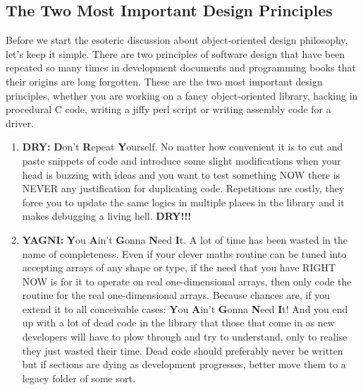\documentclass[a4paper,11pt]{article}
\begin{document}
\subsection{The Two Most Important Design Principles}
Before we start the esoteric discussion about object-oriented design philosophy, let's keep it simple. There are two principles of software design that have been repeated so many times in development documents and programming books that their origins are long forgotten. These are the two most important design principles, whether you are working on a fancy object-oriented library, hacking in procedural C code, writing a jiffy perl script or writing assembly code for a driver.
\begin{enumerate}
\item \textbf{DRY:} \textbf{D}on't \textbf{R}epeat \textbf{Y}ourself. No matter how convenient it is to cut and paste snippets of code and introduce some slight modifications when your head is buzzing with ideas and you want to test something NOW there is NEVER any justification for duplicating code. Repetitions are costly, they force you to update the same logics in multiple places in the library and it makes debugging a living hell. \textbf{DRY!!!}
\item \textbf{YAGNI:} \textbf{Y}ou \textbf{A}in't \textbf{G}onna \textbf{N}eed \textbf{I}t. A lot of time has been wasted in the name of completeness. Even if your clever maths routine can be tuned into accepting arrays of any shape or type, if the need that you have RIGHT NOW is for it to operate on real one-dimensional arrays, then only code the routine for the real one-dimensional arrays. Because chances are, if you extend it to all conceivable cases: \textbf{Y}ou \textbf{A}in't \textbf{G}onna \textbf{N}eed \textbf{I}t! And you end up with a lot of dead code in the library that those that come in as new developers will have to plow through and try to understand, only to realise they just wasted their time. Dead code should preferably never be written but if sections are dying as development progresses, better move them to a legacy folder of some sort.
\end{enumerate}
\end{document}
